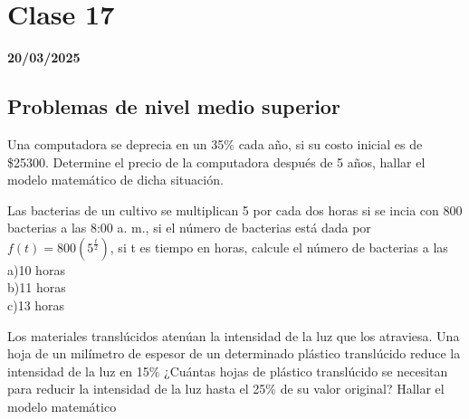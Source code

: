 \section{Clase 17}
\textbf{20/03/2025}

\subsection{Problemas de nivel medio superior}

\begin{excercise}
    Una computadora se deprecia en un 35\% cada año, si su costo inicial es de \$25300. Determine el precio de la computadora después de 5 años, hallar el modelo matemático de dicha situación.
\end{excercise}

\begin{excercise}
    Las bacterias de un cultivo se multiplican 5 por cada dos horas si se incia con 800 bacterias a las 8:00 a. m., si el número de bacterias está dada por $f(t) = 800 \left(5^{\frac{t}{2}}\right)$, si t es tiempo en horas, calcule el número de bacterias a las\\
        a)10 horas\\
        b)11 horas\\
        c)13 horas\\
\end{excercise}

\begin{excercise}
    Los materiales translúcidos atenúan la intensidad de la luz que los atraviesa. Una hoja de un milímetro de espesor de un determinado plástico translúcido reduce la intensidad de la luz en 15\% ¿Cuántas hojas de plástico translúcido se necesitan para reducir la intensidad de la luz hasta el 25\% de su valor original? Hallar el modelo matemático
\end{excercise}